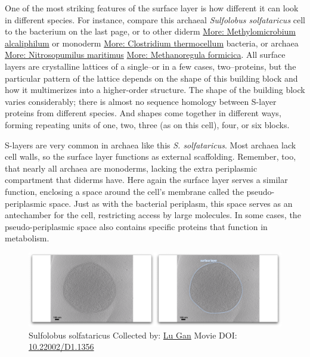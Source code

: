 \documentclass[]{tufte-book}
\begin{document}
One of the most striking features of the surface layer is how different
it can look in different species. For instance, compare this archaeal
\emph{Sulfolobus solfataricus} cell to the bacterium on the last page,
or to other diderm
\protect\hyperlink{Methylomicrobium_alcaliphilum}{More: Methylomicrobium
alcaliphilum} or monoderm
\protect\hyperlink{Clostridium_thermocellum}{More: Clostridium
thermocellum} bacteria, or archaea
\protect\hyperlink{Nitrosopumilus_maritimus}{More: Nitrosopumilus
maritimus} \protect\hyperlink{Methanoregula_formicica}{More:
Methanoregula formicica}. All surface layers are crystalline lattices of
a single--or in a few cases, two--proteins, but the particular pattern
of the lattice depends on the shape of this building block and how it
multimerizes into a higher-order structure. The shape of the building
block varies considerably; there is almost no sequence homology between
S-layer proteins from different species. And shapes come together in
different ways, forming repeating units of one, two, three (as on this
cell), four, or six blocks.

S-layers are very common in archaea like this \emph{S. solfataricus}.
Most archaea lack cell walls, so the surface layer functions as external
scaffolding. Remember, too, that nearly all archaea are monoderms,
lacking the extra periplasmic compartment that diderms have. Here again
the surface layer serves a similar function, enclosing a space around
the cell's membrane called the pseudo-periplasmic space. Just as with
the bacterial periplasm, this space serves as an antechamber for the
cell, restricting access by large molecules. In some cases, the
pseudo-periplasmic space also contains specific proteins that function
in metabolism.





\begin{figure}
\includegraphics{movie_stills/2_7} \caption[Sulfolobus solfataricus Collected by:
\protect\hyperlink{lu_gan}{Lu Gan} Movie DOI:
\href{https://doi.org/10.22002/D1.1356}{10.22002/D1.1356}]{Sulfolobus solfataricus Collected by:
\protect\hyperlink{lu_gan}{Lu Gan} Movie DOI:
\href{https://doi.org/10.22002/D1.1356}{10.22002/D1.1356}}\label{fig:2-7}
\end{figure}
\end{document}
